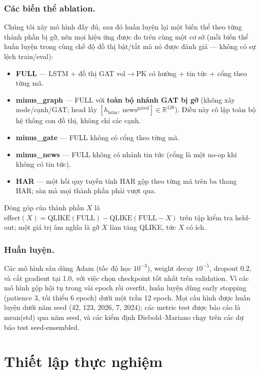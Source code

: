 \documentclass[runningheads]{llncs}
\begin{document}
\subsubsection{Các biến thể ablation.}
Chúng tôi xây mô hình đầy đủ, sau đó huấn luyện lại một biến thể theo từng thành phần bị gỡ, nên mọi hiệu
ứng được đo trên cùng một cơ sở (mỗi biến thể huấn luyện trong cùng chế độ đồ thị bật/tắt mà nó được đánh
giá --- không có sự lệch train/eval):
\begin{itemize}
\item \textbf{FULL} --- LSTM + đồ thị GAT vol$\to$PK có hướng + tin tức + cổng theo từng mã.
\item \textbf{minus\_graph} --- FULL với \textbf{toàn bộ nhánh GAT bị gỡ} (không xây node/cạnh/GAT; head
lấy $[h_{\text{lstm}},\ \text{news}^{\text{gated}}]\in\mathbb{R}^{128}$). Điều này cô lập toàn bộ hệ
thống con đồ thị, không chỉ các cạnh.
\item \textbf{minus\_gate} --- FULL không có cổng theo từng mã.
\item \textbf{minus\_news} --- FULL không có nhánh tin tức (cổng là một no-op khi không có tin tức).
\item \textbf{HAR} --- một hồi quy tuyến tính HAR gộp theo từng mã trên ba thang HAR; sàn mà mọi thành
phần phải vượt qua.
\end{itemize}
Đóng góp của thành phần $X$ là
$\text{effect}(X)=\text{QLIKE}(\text{FULL})-\text{QLIKE}(\text{FULL}{-}X)$ trên tập kiểm tra held-out;
một giá trị âm nghĩa là gỡ $X$ làm tăng QLIKE, tức $X$ có ích.

\subsubsection{Huấn luyện.}
Các mô hình sâu dùng Adam (tốc độ học $10^{-3}$), weight decay $10^{-5}$, dropout 0.2, và cắt gradient
tại 1.0, với việc chọn checkpoint tốt nhất trên validation. Vì các mô hình gộp hội tụ trong vài epoch rồi
overfit, huấn luyện dùng early stopping (patience 3, tối thiểu 6 epoch) dưới một trần 12 epoch. Mọi cấu
hình được huấn luyện dưới năm seed (42, 123, 2026, 7, 2024); các metric test được báo cáo là mean(std)
qua năm seed, và các kiểm định Diebold--Mariano chạy trên các dự báo test seed-ensembled.

\section{Thiết lập thực nghiệm}
\label{sec:setup}
\end{document}
